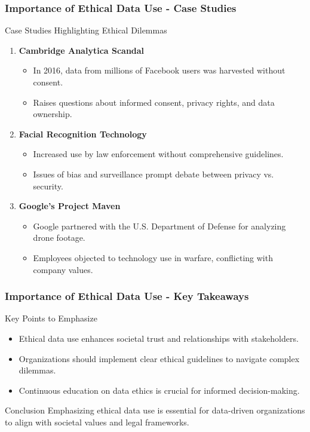 \documentclass[aspectratio=169]{beamer}
\begin{document}
\begin{frame}[fragile]
    \frametitle{Importance of Ethical Data Use - Case Studies}
    \begin{block}{Case Studies Highlighting Ethical Dilemmas}
        \begin{enumerate}
            \item \textbf{Cambridge Analytica Scandal}
                \begin{itemize}
                    \item In 2016, data from millions of Facebook users was harvested without consent.
                    \item Raises questions about informed consent, privacy rights, and data ownership.
                \end{itemize}
                
            \item \textbf{Facial Recognition Technology}
                \begin{itemize}
                    \item Increased use by law enforcement without comprehensive guidelines.
                    \item Issues of bias and surveillance prompt debate between privacy vs. security.
                \end{itemize}

            \item \textbf{Google’s Project Maven}
                \begin{itemize}
                    \item Google partnered with the U.S. Department of Defense for analyzing drone footage.
                    \item Employees objected to technology use in warfare, conflicting with company values.
                \end{itemize}
        \end{enumerate}
    \end{block}
\end{frame}

\begin{frame}[fragile]
    \frametitle{Importance of Ethical Data Use - Key Takeaways}
    \begin{block}{Key Points to Emphasize}
        \begin{itemize}
            \item Ethical data use enhances societal trust and relationships with stakeholders.
            \item Organizations should implement clear ethical guidelines to navigate complex dilemmas.
            \item Continuous education on data ethics is crucial for informed decision-making.
        \end{itemize}
    \end{block}
    
    \begin{block}{Conclusion}
        Emphasizing ethical data use is essential for data-driven organizations to align with societal values and legal frameworks.
    \end{block}
\end{frame}
\end{document}
